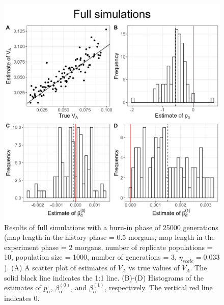 \documentclass[12pt]{article}
\begin{document}
\begin{bibunit}
\begin{figure}[H]
\includegraphics[scale = 0.15]{Figures/Fig3.jpg}
\caption{Results of full simulations with a burn-in phase of 25000 generations (map length in the history phase = 0.5 morgans, map length in the experiment phase = 2 morgans, number of replicate populations = 10, population size = 1000, number of generations = 3, $\eta_{scale} = 0.033$). (A) A scatter plot of estimates of $V_A$ vs true values of $V_A$. The solid black line indicates the 1:1 line. (B)-(D) Histograms of the estimates of $p_{\bar \alpha} $, $\beta^{(0)}_{\bar{\alpha}}$, and $\beta^{(1)}_{\bar{\alpha}}$, respectively. The vertical red line indicates 0.}
  \label{fig:Figure 3}
\end{figure}


\end{bibunit}
\end{document}
